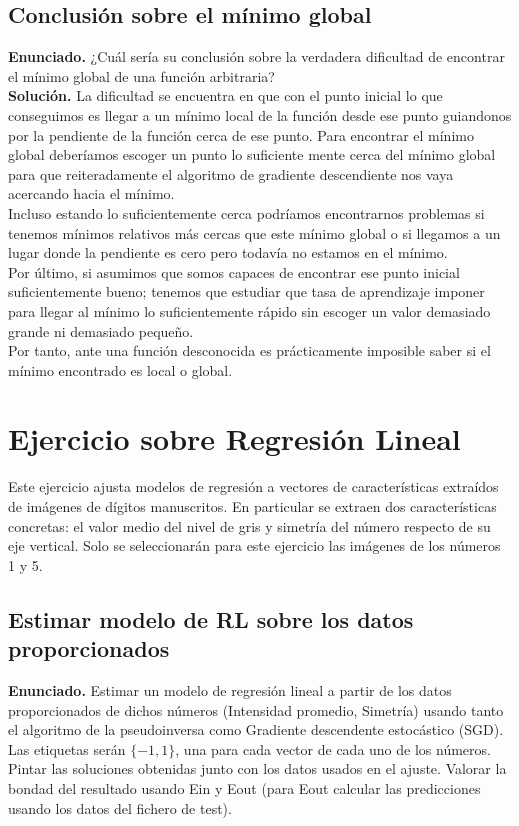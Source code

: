 \documentclass[a4paper,11pt]{article}
\begin{document}
\subsection{Conclusión sobre el mínimo global}
\textbf{Enunciado.} ¿Cuál sería su conclusión sobre la verdadera dificultad de encontrar el mínimo global de una función arbitraria?\\

\textbf{Solución.} La dificultad se encuentra en que con el punto inicial lo que conseguimos es llegar a un mínimo local de la función desde ese punto guiandonos por la pendiente de la función cerca de ese punto. Para encontrar el mínimo global deberíamos escoger un punto lo suficiente mente cerca del mínimo global para que reiteradamente el algoritmo de gradiente descendiente nos vaya acercando hacia el mínimo.\\ 

Incluso estando lo suficientemente cerca podríamos encontrarnos problemas si tenemos mínimos relativos más cercas que este mínimo global o si llegamos a un lugar donde la pendiente es cero pero todavía no estamos en el mínimo.\\

Por último, si asumimos que somos capaces de encontrar ese punto inicial suficientemente bueno; tenemos que estudiar que tasa de aprendizaje imponer para llegar al mínimo lo suficientemente rápido sin escoger un valor demasiado grande ni demasiado pequeño.\\

Por tanto, ante una función desconocida es prácticamente imposible saber si el mínimo encontrado es local o global.


\section{Ejercicio sobre Regresión Lineal}

Este ejercicio ajusta modelos de regresión a vectores de características extraídos de imágenes de dígitos manuscritos. En particular se extraen dos características concretas: el valor medio del nivel de gris y simetría del número respecto de su eje vertical. Solo se seleccionarán para este ejercicio las imágenes de los números 1 y 5.

\subsection{Estimar modelo de RL sobre los datos proporcionados}
\textbf{Enunciado.} Estimar un modelo de regresión lineal a partir de los datos proporcionados de dichos números (Intensidad promedio, Simetría) usando tanto el algoritmo de la pseudoinversa como Gradiente descendente estocástico (SGD). Las etiquetas serán $\{-1, 1\}$, una para cada vector de cada uno de los números. Pintar las soluciones obtenidas junto con los datos usados en el ajuste. Valorar la bondad del resultado usando Ein y Eout (para Eout calcular las predicciones usando los datos del fichero de test). \\
\end{document}
